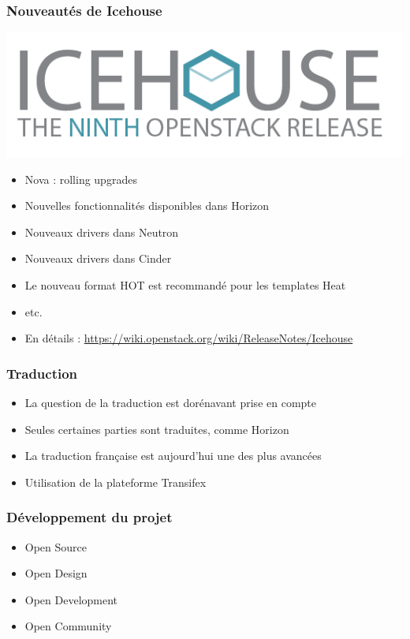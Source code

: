   \begin{frame}
    \frametitle{Nouveautés de Icehouse}
    \begin{center}
      \includegraphics{images/icehouse.png}
    \end{center}
    \begin{itemize}
      \item Nova : rolling upgrades
      \item Nouvelles fonctionnalités disponibles dans Horizon
      \item Nouveaux drivers dans Neutron
      \item Nouveaux drivers dans Cinder
      \item Le nouveau format HOT est recommandé pour les templates Heat
      \item etc.
      \item En détails : \url{https://wiki.openstack.org/wiki/ReleaseNotes/Icehouse}
    \end{itemize}
  \end{frame}

  \begin{frame}
    \frametitle{Traduction}
    \begin{itemize}
      \item La question de la traduction est dorénavant prise en compte
      \item Seules certaines parties sont traduites, comme Horizon
      \item La traduction française est aujourd'hui une des plus avancées
      \item Utilisation de la plateforme Transifex
    \end{itemize}
  \end{frame}

  \begin{frame}
    \frametitle{Développement du projet}
    \begin{itemize}
      \item Open Source
      \item Open Design
      \item Open Development
      \item Open Community
    \end{itemize}
  \end{frame}

